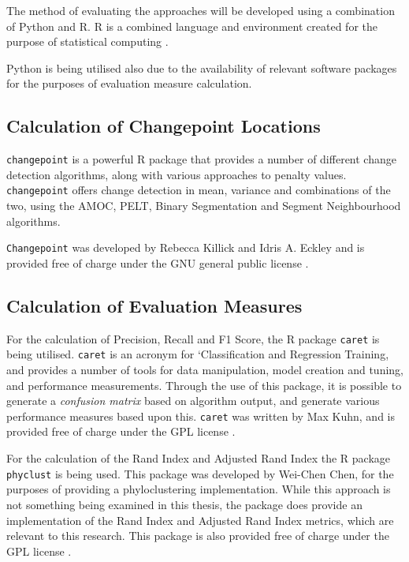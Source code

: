 \documentclass[../main.tex]{subfiles}
\begin{document}
The method of evaluating the approaches will be developed using a combination of Python and \textsf{R}. \textsf{R} is a combined language and environment created for the purpose of statistical computing \cite{RCoreTeam2017}.

Python is being utilised also due to the availability of relevant software packages for the purposes of evaluation measure calculation.

\subsection{Calculation of Changepoint Locations}

\texttt{changepoint} is a powerful R package that provides a number of different change detection algorithms, along with various approaches to penalty values. \texttt{changepoint} offers change detection in mean, variance and combinations of the two, using the AMOC, PELT, Binary Segmentation and Segment Neighbourhood algorithms.

\texttt{Changepoint} was developed by Rebecca Killick and Idris A. Eckley and is provided free of charge under the GNU general public license \cite{Killick2014}.

\subsection{Calculation of Evaluation Measures}

For the calculation of Precision, Recall and F1 Score, the \textsf{R} package \texttt{caret} is being utilised. \texttt{caret} is an acronym for `Classification and Regression Training, and provides a number of tools for data manipulation, model creation and tuning, and performance measurements. Through the use of this package, it is possible to generate a \emph{confusion matrix} based on algorithm output, and generate various performance measures based upon this. \texttt{caret} was written by Max Kuhn, and is provided free of charge under the GPL license \cite{FromJedWing2017}.

For the calculation of the Rand Index and Adjusted Rand Index the \textsf{R} package \texttt{phyclust} is being used. This package was developed by Wei-Chen Chen, for the purposes of providing a phyloclustering implementation. While this approach is not something being examined in this thesis, the package does provide an implementation of the Rand Index and Adjusted Rand Index metrics, which are relevant to this research. This package is also provided free of charge under the GPL license \cite{Chen2011}.
\end{document}
